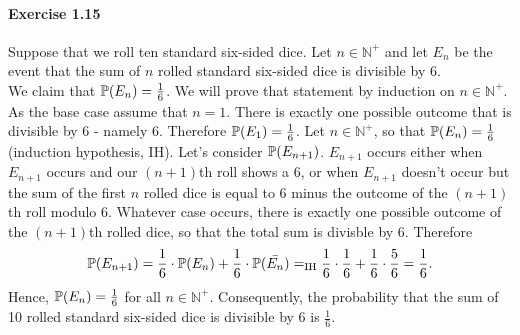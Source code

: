 \paragraph{Exercise 1.15} Suppose that we roll ten standard six-sided dice.
Let $n \in \mathbb{N}^+$ and let $E_n$ be the event that the sum of $n$ rolled
standard six-sided dice is divisible by 6. \\
We claim that $\mathbb{P}(E_n) = \frac{1}{6}$. We will prove that statement by induction
on $n \in \mathbb{N}^+$. As the base case assume that $n=1$. There is exactly one
possible outcome that is divisible by 6 - namely 6. Therefore $\mathbb{P}(E_1) = \frac{1}{6}$.
Let $n \in \mathbb{N}^+$, so that $\mathbb{P}(E_n) = \frac{1}{6}$ (induction hypothesis,
IH). Let's consider $\mathbb{P}(E_{n+1})$. $E_{n+1}$ occurs either when $E_{n+1}$ occurs
and our $(n+1)$th roll shows a 6, or when $E_{n+1}$ doesn't occur but the sum of
the first $n$ rolled dice is equal to 6 minus the outcome of the $(n+1)$th roll
modulo 6. Whatever case occurs, there is exactly one possible outcome of the
$(n+1)$th rolled dice, so that the total sum is divisble by 6. Therefore
\[
  \mathbb{P}(E_{n+1})
    = \frac{1}{6} \cdot \mathbb{P}(E_n) + \frac{1}{6} \cdot \mathbb{P}(\bar{E_n})
    =_{\text{IH}} \frac{1}{6} \cdot \frac{1}{6} + \frac{1}{6} \cdot \frac{5}{6}
    = \frac{1}{6}.
\]
Hence, $\mathbb{P}(E_n) = \frac{1}{6}$ for all $n \in \mathbb{N}^+$. Consequently, the
probability that the sum of 10 rolled standard six-sided dice is divisible by
6 is $\frac{1}{6}$.
